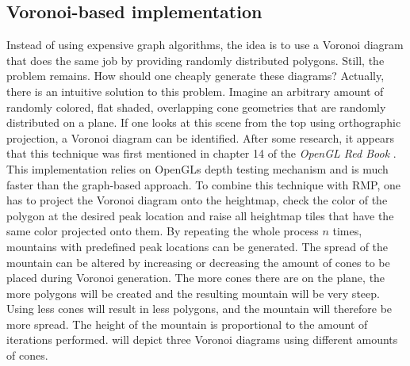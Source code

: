 \documentclass[11pt,a4paper,twoside,openright]{report}
\begin{document}
\subsection{Voronoi-based implementation}
\label{subsec:voronoibasedimpl}
Instead of using expensive graph algorithms, the idea is to use a Voronoi diagram that does the same job by providing randomly distributed polygons. Still, the problem remains. How should one cheaply generate these diagrams? Actually, there is an intuitive solution to this problem. Imagine an arbitrary amount of randomly colored, flat shaded, overlapping cone geometries that are randomly distributed on a plane. If one looks at this scene from the top using orthographic projection, a Voronoi diagram can be identified. After some research, it appears that this technique was first mentioned in chapter 14 of the \emph{OpenGL Red Book} \cite{Woo:1999:OPG:554539}. This implementation relies on OpenGLs depth testing mechanism and is much faster than the graph-based approach. To combine this technique with RMP, one has to project the Voronoi diagram onto the heightmap, check the color of the polygon at the desired peak location and raise all heightmap tiles that have the same color projected onto them. By repeating the whole process $n$ times, mountains with predefined peak locations can be generated. The spread of the mountain can be altered by increasing or decreasing the amount of cones to be placed during Voronoi generation. The more cones there are on the plane, the more polygons will be created and the resulting mountain will be very steep. Using less cones will result in less polygons, and the mountain will therefore be more spread. The height of the mountain is proportional to the amount of iterations performed.  will depict three Voronoi diagrams using different amounts of cones.
\end{document}
